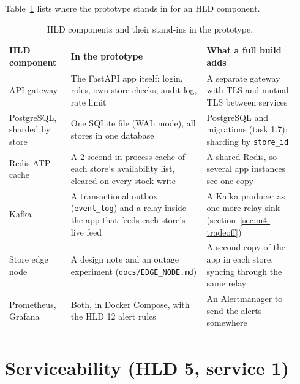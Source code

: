 Table~\ref{tab:hld-vs-prototype} lists where the prototype stands in for an HLD component.

\begin{table}[ht]
  \centering
  \footnotesize
  \begin{tabular}{@{}>{\raggedright\arraybackslash}p{0.2\linewidth}>{\raggedright\arraybackslash}p{0.44\linewidth}
                  >{\raggedright\arraybackslash}p{0.3\linewidth}@{}}
    \toprule
    HLD component & In the prototype & What a full build adds \\
    \midrule
    API gateway & The FastAPI app itself: login, roles, own-store checks, audit log, rate limit & A separate gateway
      with TLS and mutual TLS between services \\
    \addlinespace[3pt]
    PostgreSQL, sharded by store & One SQLite file (WAL mode), all stores in one database & PostgreSQL and
      migrations (task 1.7); sharding by \texttt{store\_id} \\
    \addlinespace[3pt]
    Redis ATP cache & A 2-second in-process cache of each store's availability list, cleared on every stock write
      & A shared Redis, so several app instances see one copy \\
    \addlinespace[3pt]
    Kafka & A transactional outbox (\texttt{event\_log}) and a relay inside the app that feeds each store's live feed
      & A Kafka producer as one more relay sink (section~\ref{sec:m4-tradeoff}) \\
    \addlinespace[3pt]
    Store edge node & A design note and an outage experiment (\texttt{docs/EDGE\_NODE.md}) & A second copy of the
      app in each store, syncing through the same relay \\
    \addlinespace[3pt]
    Prometheus, Grafana & Both, in Docker Compose, with the HLD 12 alert rules & An Alertmanager to send the
      alerts somewhere \\
    \bottomrule
  \end{tabular}
  \caption{HLD components and their stand-ins in the prototype.}
  \label{tab:hld-vs-prototype}
\end{table}

\section{Serviceability (HLD 5, service 1)}

